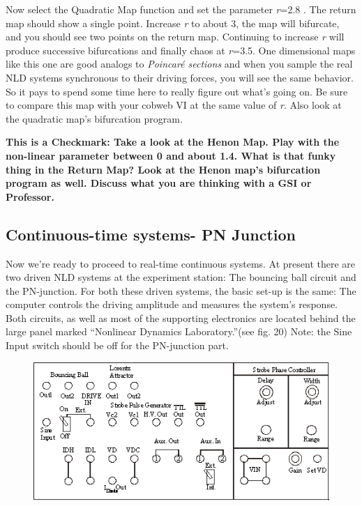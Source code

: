 \documentclass{../lab}
\begin{document}
Now select the Quadratic Map function and set the parameter \emph{r}=2.8 . The return map should show a single point. Increase \emph{r} to about 3, the map will bifurcate, and you should see two points on the return map. Continuing to increase \emph{r} will produce successive bifurcations and finally chaos at \emph{r}=3.5. One dimensional maps like this one are good analogs to \emph{Poincaré sections} and when you sample the real NLD systems synchronous to their driving forces, you will see the same behavior. So it pays to spend some time here to really figure out what's going on. Be sure to compare this map with your cobweb VI at the same value of \emph{r}. Also look at the quadratic map's bifurcation program.

\textbf{This is a Checkmark: Take a look at the Henon Map. Play with the non-linear parameter between 0 and about 1.4. What is that funky thing in the Return Map? Look at the Henon map's bifurcation program as well. Discuss what you are thinking with a GSI or Professor.}

\subsection{Continuous-time systems- PN Junction}

Now we're ready to proceed to real-time continuous systems. At present there are two driven NLD systems at the experiment station: The bouncing ball circuit and the PN-junction. For both these driven systems, the basic set-up is the same: The computer controls the driving amplitude and measures the system's response. Both circuits, as well as most of the supporting electronics are located behind the large panel marked ``Nonlinear Dynamics Laboratory.''(see fig. 20) Note: the Sine Input switch should be off for the PN-junction part.


\begin{figure}[h]
    \centering
    \href{http://experimentationlab.berkeley.edu/sites/default/files/images/Nldimage115.gif}{\includegraphics[width=0.5\linewidth]{images/Nldimage115.png}}
    \caption{}
    \label{fig:Nldimage115}
\end{figure}
\end{document}
